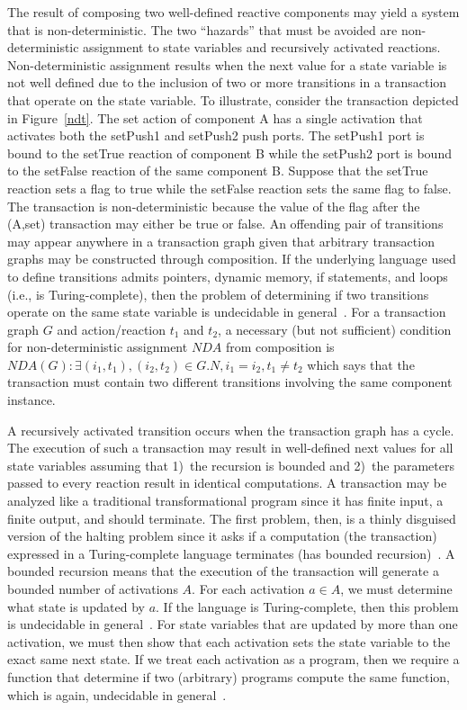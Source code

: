 The result of composing two well-defined reactive components may yield a system that is non-deterministic.
The two ``hazards'' that must be avoided are non-deterministic assignment to state variables and recursively activated reactions.
Non-deterministic assignment results when the next value for a state variable is not well defined due to the inclusion of two or more transitions in a transaction that operate on the state variable.
To illustrate, consider the transaction depicted in Figure~\ref{ndt}.
The set action of component A has a single activation that activates both the setPush1 and setPush2 push ports.
The setPush1 port is bound to the setTrue reaction of component B while the setPush2 port is bound to the setFalse reaction of the same component B.
Suppose that the setTrue reaction sets a flag to true while the setFalse reaction sets the same flag to false.
The transaction is non-deterministic because the value of the flag after the (A,set) transaction may either be true or false.
An offending pair of transitions may appear anywhere in a transaction graph given that arbitrary transaction graphs may be constructed through composition.
If the underlying language used to define transitions admits pointers, dynamic memory, if statements, and loops (i.e., is Turing-complete), then the problem of determining if two transitions operate on the same state variable is undecidable in general~\cite{Landi:1992:USA:161494.161501, Ramalingam:1994:UA:186025.186041}.
For a transaction graph $G$ and action/reaction $t_1$ and $t_2$, a necessary (but not sufficient) condition for non-deterministic assignment $\mathit{NDA}$ from composition is $\mathit{NDA}(G): \exists (i_1, t_1), (i_2, t_2) \in G.N, i_1 = i_2, t_1 \ne t_2$ which says that the transaction must contain two different transitions involving the same component instance.

A recursively activated transition occurs when the transaction graph has a cycle.
The execution of such a transaction may result in well-defined next values for all state variables assuming that 1)~the recursion is bounded and 2)~the parameters passed to every reaction result in identical computations.
A transaction may be analyzed like a traditional transformational program since it has finite input, a finite output, and should terminate.
The first problem, then, is a thinly disguised version of the halting problem since it asks if a computation (the transaction) expressed in a Turing-complete language terminates (has bounded recursion)~\cite{Turing01011937, davis1958computability}.
A bounded recursion means that the execution of the transaction will generate a bounded number of activations $A$.
For each activation $a \in A$, we must determine what state is updated by $a$.
If the language is Turing-complete, then this problem is undecidable in general~\cite{Landi:1992:USA:161494.161501, Ramalingam:1994:UA:186025.186041}.
For state variables that are updated by more than one activation, we must then show that each activation sets the state variable to the exact same next state.
If we treat each activation as a program, then we require a function that determine if two (arbitrary) programs compute the same function, which is again, undecidable in general~\cite{Rice:53}.

